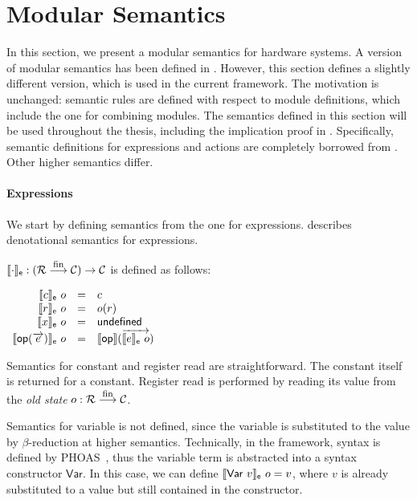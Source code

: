 \section{Modular Semantics}
\label{sec-semmod}

In this section, we present a modular semantics for hardware
systems. A version of modular semantics has been defined in
\cite{murali-thesis}.  However, this section defines a slightly
different version, which is used in the current \Kami{} framework.
The motivation is unchanged: semantic rules are defined with respect
to module definitions, which include the one for combining
modules. The semantics defined in this section will be used throughout
the thesis, including the implication proof in
. Specifically, semantic definitions for
expressions and actions are completely borrowed from
\cite{murali-thesis}. Other higher semantics differ.

\paragraph{Expressions}

We start by defining semantics from the one for expressions.
 describes denotational semantics \ssemexpr{\cdot}
for expressions.

\begin{definition}
  \label{def-semexpr}
  $\llbracket \cdot \rrbracket_{\textsf{e}} : (\mathcal{R} \stackrel{\textrm{\footnotesize{fin}}}{\longrightarrow} \mathcal{C}{}) \to \mathcal{C}$ is
  defined as follows:
  \begin{center}
    \begin{math}
      \begin{array}{rcl}
        \llbracket c \rrbracket_{\textsf{e}}\ o & = & c \\
        \llbracket r \rrbracket_{\textsf{e}}\ o & = & o(r) \\
        \llbracket x \rrbracket_{\textsf{e}}\ o & = & \textsf{undefined} \\
        \llbracket \textsf{op}{}(\overrightarrow{e}) \rrbracket_{\textsf{e}}\ o & = & \llbracket \textsf{op}{} \rrbracket(\overrightarrow{\llbracket e \rrbracket_{\textsf{e}}\ o}) \\
      \end{array}
    \end{math}
  \end{center}
\end{definition}

Semantics for constant and register read are straightforward. The
constant itself is returned for a constant. Register read is performed
by reading its value from the \emph{old state} $o: \mathcal{R} \stackrel{\textrm{\footnotesize{fin}}}{\longrightarrow} \mathcal{C}$.

Semantics for variable is not defined, since the variable is
substituted to the value by $\beta$-reduction at higher semantics.
Technically, in the \Kami{} framework, syntax is defined by
PHOAS~\cite{adam-icfp}, thus the variable term is abstracted into a
syntax constructor $\textsf{Var}$. In this case, we can define
$\llbracket \textsf{Var}\ v \rrbracket_{\textsf{e}}\ o = v$, where $v$ is already substituted
to a value but still contained in the constructor.

